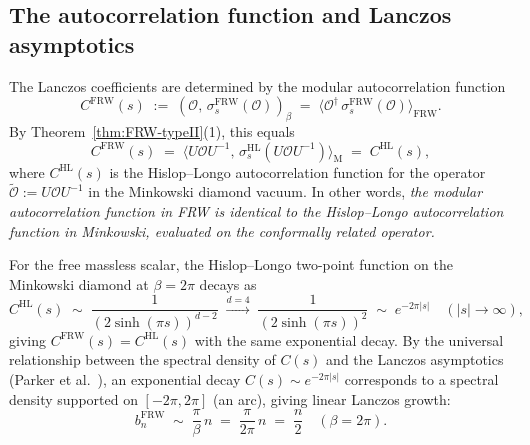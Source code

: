 \documentclass[12pt,a4paper]{article}
\theoremstyle{definition}
\newcommand{\HL}{\mathrm{HL}}
\newcommand{\FRW}{\mathrm{FRW}}
\newcommand{\Mink}{\mathrm{M}}
\begin{document}
\subsection{The autocorrelation function and Lanczos asymptotics}

The Lanczos coefficients are determined by the modular autocorrelation
function
\begin{equation}
  C^\FRW(s) \;:=\; (\mathcal{O},\,\sigma_s^\FRW(\mathcal{O}))_\beta
  \;=\; \langle \mathcal{O}^\dagger\,\sigma_s^\FRW(\mathcal{O})\rangle_\FRW.
  \label{eq:autocorr}
\end{equation}
By Theorem~\ref{thm:FRW-typeII}(1), this equals
\begin{equation}
  C^\FRW(s)
  \;=\; \langle U\mathcal{O}U^{-1},\,\sigma_s^\HL(U\mathcal{O}U^{-1})\rangle_\Mink
  \;=\; C^\HL(s),
  \label{eq:autocorr-pullback}
\end{equation}
where $C^\HL(s)$ is the Hislop--Longo autocorrelation function for
the operator $\tilde{\mathcal{O}} := U\mathcal{O}U^{-1}$ in the
Minkowski diamond vacuum.
In other words, \emph{the modular autocorrelation function in FRW is
identical to the Hislop--Longo autocorrelation function in Minkowski,
evaluated on the conformally related operator.}

For the free massless scalar, the Hislop--Longo two-point function
on the Minkowski diamond at $\beta = 2\pi$ decays as
\begin{equation}
  C^\HL(s) \;\sim\; \frac{1}{(2\sinh(\pi s))^{d-2}}
  \;\xrightarrow{d=4}\; \frac{1}{(2\sinh(\pi s))^2}
  \;\sim\; e^{-2\pi|s|}
  \quad (|s| \to \infty),
  \label{eq:autocorr-HL}
\end{equation}
giving $C^\FRW(s) = C^\HL(s)$ with the same exponential decay.
By the universal relationship between the spectral density of $C(s)$
and the Lanczos asymptotics (Parker et al.~\cite{Parker2019}),
an exponential decay $C(s) \sim e^{-2\pi|s|}$ corresponds to a
spectral density supported on $[-2\pi, 2\pi]$ (an arc), giving
linear Lanczos growth:
\begin{equation}
  b_n^\FRW \;\sim\; \frac{\pi}{\beta}\,n
  \;=\; \frac{\pi}{2\pi}\,n \;=\; \frac{n}{2}
  \quad (\beta = 2\pi).
  \label{eq:lanczos-FRW}
\end{equation}
\end{document}

